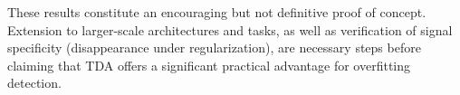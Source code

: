 \documentclass[11pt,a4paper]{article}
\begin{document}
These results constitute an encouraging but not definitive proof of concept.
Extension to larger-scale architectures and tasks, as well as verification of
signal specificity (disappearance under regularization), are necessary
steps before claiming that TDA offers a significant practical advantage for
overfitting detection.

\printbibliography
\end{document}
